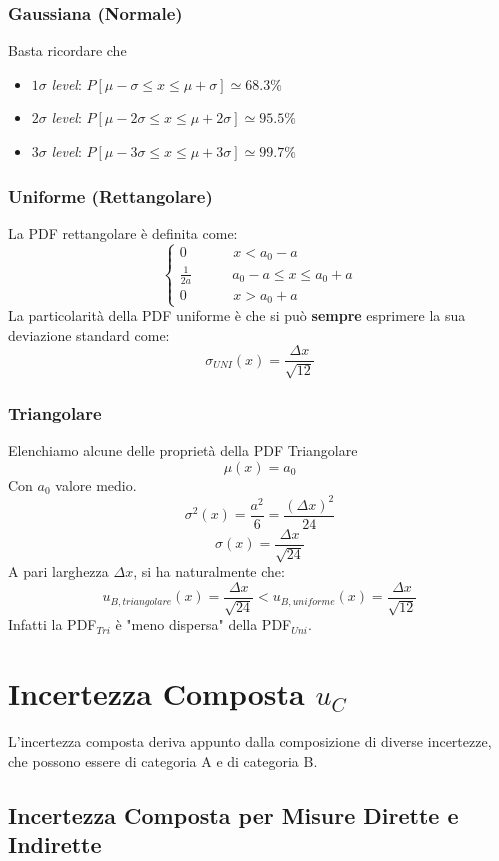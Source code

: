 \documentclass[a4paper,11pt]{report}
\begin{document}
\subsubsection{Gaussiana (Normale)}
Basta ricordare che
\begin{center}
\begin{itemize}
  \item $1\sigma$ \textit{level}: $P[\mu-\sigma \le x \le \mu+\sigma] \simeq 68.3\%$
  \item $2\sigma$ \textit{level}: $P[\mu-2\sigma \le x \le \mu+2\sigma] \simeq 95.5\%$
    \item $3\sigma$ \textit{level}: $P[\mu-3\sigma \le x \le \mu+3\sigma] \simeq 99.7\%$
\end{itemize}  
\end{center}
\subsubsection{Uniforme (Rettangolare)}
La PDF rettangolare è definita come:
\begin{equation}
   \begin{cases}
   0~~~~~~~~~~~~~~~x < a_0 -a\\
   \frac{1}{2a}~~~~~~~~~~~~~a_0 -a \le x \le a_0 + a\\
   0~~~~~~~~~~~~~~~x > a_0 +a
   \end{cases}
\end{equation}
La particolarità della PDF uniforme è che si può \textbf{sempre} esprimere la sua deviazione standard come:
$$
  \sigma_{UNI}(x) = \frac{\Delta x}{\sqrt{12}}
$$
\subsubsection{Triangolare}
Elenchiamo alcune delle proprietà della PDF Triangolare
$$
  \mu(x) = a_0
$$
Con $a_0$ valore medio.
$$
  \sigma^2(x) = \frac{a^2}{6} = \frac{(\Delta x)^2}{24}
$$
$$
  \sigma(x) = \frac{\Delta x}{\sqrt{24}}
$$
A pari larghezza $\Delta x$, si ha naturalmente che:
$$
  u_{B,triangolare}(x) = \frac{\Delta x}{\sqrt{24}} < u_{B,uniforme}(x) = \frac{\Delta x}{\sqrt{12}}
$$
Infatti la PDF$_{Tri}$ è "meno dispersa" della PDF$_{Uni}$.
\newpage
\section{Incertezza Composta $u_C$}
L'incertezza composta deriva appunto dalla composizione di diverse incertezze, che possono essere di categoria A e di categoria B.
\subsection{Incertezza Composta per Misure Dirette e Indirette}
\end{document}
